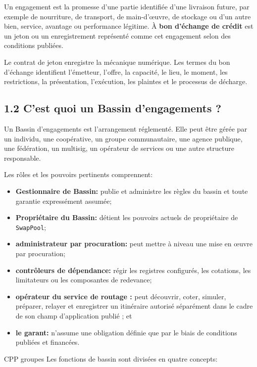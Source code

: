 \documentclass[11pt]{article}
\begin{document}
Un engagement est la promesse d'une partie identifiée d'une livraison future, par exemple de nourriture, de transport, de main-d'œuvre, de stockage ou d'un autre bien, service, avantage ou performance légitime. À \textbf{bon d'échange de crédit} est un jeton ou un enregistrement représenté comme cet engagement selon des conditions publiées.

Le contrat de jeton enregistre la mécanique numérique. Les termes du bon d'échange identifient l'émetteur, l'offre, la capacité, le lieu, le moment, les restrictions, la présentation, l'exécution, les plaintes et le processus de décharge.

\subsection*{1.2 C'est quoi un Bassin d'engagements ?}

Un Bassin d'engagements est l'arrangement réglementé. Elle peut être gérée par un individu, une coopérative, un groupe communautaire, une agence publique, une fédération, un multisig, un opérateur de services ou une autre structure responsable.

Les rôles et les pouvoirs pertinents comprennent:

\begin{itemize}[leftmargin=*]
\item \textbf{Gestionnaire de Bassin:} publie et administre les règles du bassin et toute garantie expressément assumée;
\item \textbf{Propriétaire du Bassin:} détient les pouvoirs actuels de propriétaire de \texttt{SwapPool};
\item \textbf{administrateur par procuration:} peut mettre à niveau une mise en œuvre par procuration;
\item \textbf{contrôleurs de dépendance:} régir les registres configurés, les cotations, les limitateurs ou les composantes de redevance;
\item \textbf{opérateur du service de routage :} peut découvrir, coter, simuler, préparer, relayer et enregistrer un itinéraire autorisé séparément dans le cadre de son champ d'application publié ; et
\item \textbf{le garant:} n'assume une obligation définie que par le biais de conditions publiées et financées.
\end{itemize}
CPP groupes Les fonctions de bassin sont divisées en quatre concepts:
\end{document}
